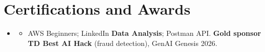 \documentclass[letterpaper,11pt]{article}
\newcommand{\resumeItem}[1]{
  \item\small{
    {#1 \vspace{-2pt}}
  }
}
\newcommand{\resumeSubHeadingListStart}{\begin{itemize}[leftmargin=0.0in, label={}]}
\newcommand{\resumeSubHeadingListEnd}{\end{itemize}}
\newcommand{\resumeItemListStart}{\begin{itemize}[leftmargin=0.14in, topsep=0pt, itemsep=0pt, parsep=0pt, partopsep=0pt]}
\newcommand{\resumeItemListEnd}{\end{itemize}\vspace{-2pt}}
\begin{document}
\vspace{-6pt}
\section{Certifications and Awards}
    \resumeSubHeadingListStart
      \item[]
          \resumeItemListStart
            \resumeItem{AWS Beginners; LinkedIn \textbf{Data Analysis}; Postman API. \textbf{Gold sponsor TD Best AI Hack} (fraud detection), GenAI Genesis 2026.}
          \resumeItemListEnd
   \resumeSubHeadingListEnd
\end{document}
